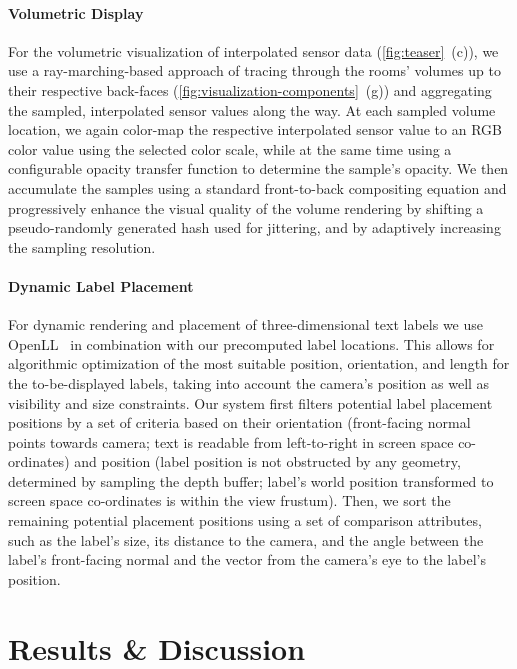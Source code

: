 \documentclass{egpubl}
\begin{document}
\paragraph*{Volumetric Display} 

For the volumetric visualization of interpolated sensor data (\autoref{fig:teaser}~(c)), we use a ray-marching-based approach of tracing through the rooms’ volumes up to their respective back-faces (\autoref{fig:visualization-components}~(g)) and aggregating the sampled, interpolated sensor values along the way.
At each sampled volume location, we again color-map the respective interpolated sensor value to an RGB color value using the selected color scale, while at the same time using a configurable opacity transfer function to determine the sample’s opacity.
We then accumulate the samples using a standard front-to-back compositing equation and progressively enhance the visual quality of the volume rendering by shifting a pseudo-randomly generated hash used for jittering, and by adaptively increasing the sampling resolution. 

\paragraph*{Dynamic Label Placement} 

For dynamic rendering and placement of three-dimensional text labels we use OpenLL~\cite{limberger2018-openll} in combination with our precomputed label locations. 
This allows for algorithmic optimization of the most suitable position, orientation, and length for the to-be-displayed labels, taking into account the camera’s position as well as visibility and size constraints.
Our system first filters potential label placement positions by a set of criteria based on their orientation (front-facing normal points towards camera; text is readable from left-to-right in screen space co-ordinates) and position (label position is not obstructed by any geometry, determined by sampling the depth buffer; label’s world position transformed to screen space co-ordinates is within the view frustum). 
Then, we sort the remaining potential placement positions using a set of comparison attributes, such as the label’s size, its distance to the camera, and the angle between the label’s front-facing normal and the vector from the camera’s eye to the label’s position. 

\section{Results \& Discussion}
\end{document}
